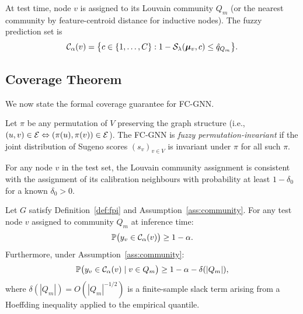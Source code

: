 At test time, node $v$ is assigned to its Louvain community $Q_m$ (or the
nearest community by feature-centroid distance for inductive nodes).
The fuzzy prediction set is
\[
  \mathcal{C}_\alpha(v)
  = \bigl\{c \in \{1,\ldots,C\} :
    1 - \mathcal{S}_\lambda(\bm{\mu}_v, c) \le \hat{q}_{Q_m}\bigr\}.
\]

\subsection{Coverage Theorem}
\label{sec:theorem}

We now state the formal coverage guarantee for FC-GNN.

\begin{definition}
\label{def:fpi}
Let $\pi$ be any permutation of $V$ preserving the graph structure
(i.e., $(u,v) \in \mathcal{E} \Leftrightarrow (\pi(u),\pi(v)) \in \mathcal{E}$).
The FC-GNN is \emph{fuzzy permutation-invariant} if the joint distribution
of Sugeno scores $(s_v)_{v \in V}$ is invariant under $\pi$ for all such $\pi$.
\end{definition}

\begin{assumption}
\label{ass:community}
For any node $v$ in the test set, the Louvain community assignment is
consistent with the assignment of its calibration neighbours with probability
at least $1 - \delta_0$ for a known $\delta_0 > 0$.
\end{assumption}

\begin{theorem}
\label{thm:coverage}
Let $G$ satisfy Definition~\ref{def:fpi} and Assumption~\ref{ass:community}.
For any test node $v$ assigned to community $Q_m$ at inference time:
\[
  \mathbb{P}\bigl(y_v \in \mathcal{C}_\alpha(v)\bigr) \ge 1 - \alpha.
\]
Furthermore, under Assumption~\ref{ass:community}:
\[
  \mathbb{P}\bigl(y_v \in \mathcal{C}_\alpha(v) \mid v \in Q_m\bigr)
  \ge 1 - \alpha - \delta(|Q_m|),
\]
where $\delta(|Q_m|) = O(|Q_m|^{-1/2})$ is a finite-sample slack term
arising from a Hoeffding inequality applied to the empirical quantile.
\end{theorem}

